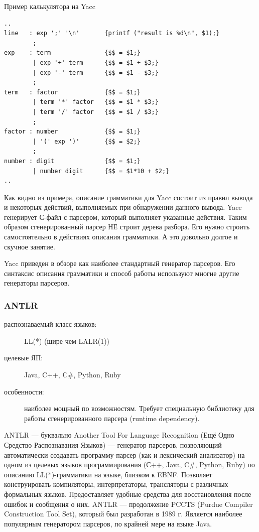 \documentclass[a4paper,12pt,titlepage]{extarticle}
\begin{document}
Пример калькулятора на Yacc
\begin{verbatim}
..
line   : exp ';' '\n'       {printf ("result is %d\n", $1);}
        ;
exp    : term               {$$ = $1;}
        | exp '+' term      {$$ = $1 + $3;}
        | exp '-' term      {$$ = $1 - $3;}
        ;
term   : factor             {$$ = $1;}
        | term '*' factor   {$$ = $1 * $3;}
        | term '/' factor   {$$ = $1 / $3;}
        ;
factor : number             {$$ = $1;}
        | '(' exp ')'       {$$ = $2;}
        ;
number : digit              {$$ = $1;}
        | number digit      {$$ = $1*10 + $2;}
..
\end{verbatim}

Как видно из примера, описание грамматики для Yacc состоит из правил вывода и
некоторых действий, выполняемых при обнаружении данного вывода.
Yacc генерирует С-файл с парсером, который выполняет указанные действия.
Таким образом сгенерированный парсер НЕ строит дерева разбора. Его нужно строить
самостоятельно в действиях описания грамматики. А это довольно долгое и скучное
занятие.

Yacc приведен в обзоре как наиболее стандартный генератор парсеров.
Его синтаксис описания грамматики и способ работы используют многие другие
генераторы парсеров.

\subsubsection*{ANTLR}
\begin{description}
  \item[распознаваемый класс языков:] LL(*) (шире чем LALR(1))
  \item[целевые ЯП:] Java, C++, C\#, Python, Ruby
  \item[особенности:] наиболее мощный по возможностям. Требует специальную
  библиотеку для работы сгенерированного парсера (runtime dependency).
\end{description}
ANTLR — буквально Another Tool For Language Recognition (Ещё Одно Средство
Распознавания Языков) — генератор парсеров, позволяющий автоматически создавать
программу-парсер (как и лексический анализатор) на одном из целевых языков
программирования (С++, Java, C\#, Python, Ruby) по описанию LL(*)-грамматики на
языке, близком к EBNF. Позволяет конструировать компиляторы, интерпретаторы,
трансляторы с различных формальных языков. Предоставляет удобные средства для
восстановления после ошибок и сообщения о них. ANTLR — продолжение PCCTS (Purdue
Compiler Construction Tool Set), который был разработан в 1989 г. Является
наиболее популярным генератором парсеров, по крайней мере на языке Java.
\end{document}
